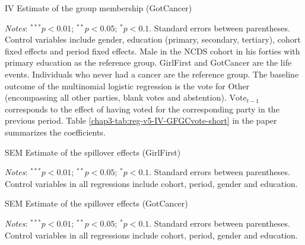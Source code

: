 \begin{table}[!htb]
    \centering
    \caption{IV Estimate of the group membership (GotCancer)}
    \label{chap3-tab:reg-v5-IV-GCvote}
    \begin{threeparttable}
        \setlength{\tabcolsep}{3pt}
        
        \begin{tablenotes}[flushleft]
            \footnotesize{\item \textit{Notes}: $^{***}p<0.01$; $^{**}p<0.05$; $^{*}p<0.1$. Standard errors between parentheses. Control variables include gender, education (primary, secondary, tertiary), cohort fixed effects and period fixed effects. Male in the NCDS cohort in his forties with primary education as the reference group. GirlFirst and GotCancer are the life events. Individuals who never had a cancer are the reference group.
            The baseline outcome of the multinomial logistic regression is the vote for Other (encompassing all other parties, blank votes and abstention). $\text{Vote}_{t-1}$ corresponds to the effect of having voted for the corresponding party in the previous period.
            Table \ref{chap3-tab:reg-v5-IV-GFGCvote-short} in the paper summarizes the coefficients.}
        \end{tablenotes}
    \end{threeparttable}
\end{table}

\begin{table}[!htb]
    \centering
    \caption{SEM Estimate of the spillover effects (GirlFirst)}
    \label{chap3-tab:reg-v5-sem-GF-stage12}
    \begin{threeparttable}
        
        \begin{tablenotes}[flushleft]
            \footnotesize{\item \textit{Notes}: $^{***}p<0.01$; $^{**}p<0.05$; $^{*}p<0.1$. Standard errors between parentheses. Control variables in all regressions include cohort, period, gender and education.}
        \end{tablenotes}
    \end{threeparttable}%
\end{table}

\begin{table}[!htb]
    \centering
    \caption{SEM Estimate of the spillover effects (GotCancer)}
    \label{chap3-tab:reg-v5-sem-GC-stage12}
    \begin{threeparttable}
        
        \begin{tablenotes}[flushleft]
            \footnotesize{\item \textit{Notes}: $^{***}p<0.01$; $^{**}p<0.05$; $^{*}p<0.1$. Standard errors between parentheses. Control variables in all regressions include cohort, period, gender and education.}
        \end{tablenotes}
    \end{threeparttable}%
\end{table}

